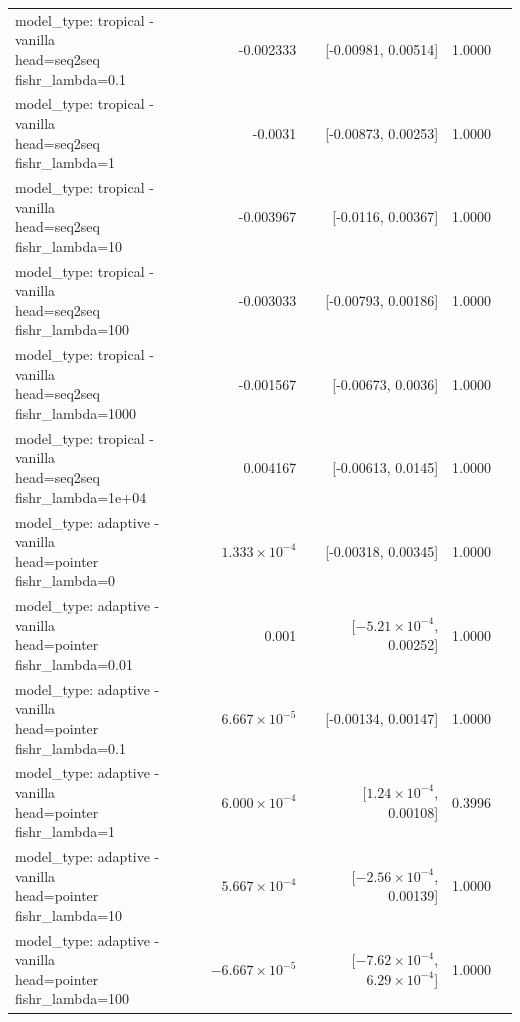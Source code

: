 \documentclass[10pt]{article}
\makeatletter
\newcommand{\stackcell}[1]{\begin{tabular}[t]{@{}l@{}}#1\end{tabular}}
\makeatother
\begin{document}
{\begin{longtable}{lrrrl}
\stackcell{model\_type: tropical - vanilla\\\footnotesize head=seq2seq fishr\_lambda=0.1 } & -0.002333 & [-0.00981, 0.00514] & 1.0000 & \\
\stackcell{model\_type: tropical - vanilla\\\footnotesize head=seq2seq fishr\_lambda=1 } & -0.0031 & [-0.00873, 0.00253] & 1.0000 & \\
\stackcell{model\_type: tropical - vanilla\\\footnotesize head=seq2seq fishr\_lambda=10 } & -0.003967 & [-0.0116, 0.00367] & 1.0000 & \\
\stackcell{model\_type: tropical - vanilla\\\footnotesize head=seq2seq fishr\_lambda=100 } & -0.003033 & [-0.00793, 0.00186] & 1.0000 & \\
\stackcell{model\_type: tropical - vanilla\\\footnotesize head=seq2seq fishr\_lambda=1000 } & -0.001567 & [-0.00673, 0.0036] & 1.0000 & \\
\stackcell{model\_type: tropical - vanilla\\\footnotesize head=seq2seq fishr\_lambda=1e+04 } & 0.004167 & [-0.00613, 0.0145] & 1.0000 & \\
\stackcell{model\_type: adaptive - vanilla\\\footnotesize head=pointer fishr\_lambda=0 } & $1.333\times10^{-4}$ & [-0.00318, 0.00345] & 1.0000 & \\
\stackcell{model\_type: adaptive - vanilla\\\footnotesize head=pointer fishr\_lambda=0.01 } & 0.001 & [$-5.21\times10^{-4}$, 0.00252] & 1.0000 & \\
\stackcell{model\_type: adaptive - vanilla\\\footnotesize head=pointer fishr\_lambda=0.1 } & $6.667\times10^{-5}$ & [-0.00134, 0.00147] & 1.0000 & \\
\stackcell{model\_type: adaptive - vanilla\\\footnotesize head=pointer fishr\_lambda=1 } & $6.000\times10^{-4}$ & [$1.24\times10^{-4}$, 0.00108] & 0.3996 & \\
\stackcell{model\_type: adaptive - vanilla\\\footnotesize head=pointer fishr\_lambda=10 } & $5.667\times10^{-4}$ & [$-2.56\times10^{-4}$, 0.00139] & 1.0000 & \\
\stackcell{model\_type: adaptive - vanilla\\\footnotesize head=pointer fishr\_lambda=100 } & $-6.667\times10^{-5}$ & [$-7.62\times10^{-4}$, $6.29\times10^{-4}$] & 1.0000 & \\

\end{longtable}}
\end{document}
